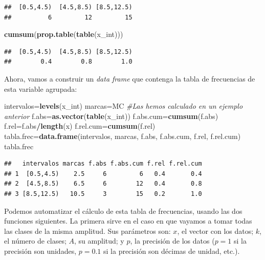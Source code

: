 \documentclass[]{book}
\newenvironment{Shaded}{\begin{snugshade}}{\end{snugshade}}
\newcommand{\CommentTok}[1]{\textcolor[rgb]{0.56,0.35,0.01}{\textit{#1}}}
\newcommand{\KeywordTok}[1]{\textcolor[rgb]{0.13,0.29,0.53}{\textbf{#1}}}
\newcommand{\NormalTok}[1]{#1}
\newcommand{\OperatorTok}[1]{\textcolor[rgb]{0.81,0.36,0.00}{\textbf{#1}}}
\theoremstyle{definition}
\theoremstyle{definition}
\theoremstyle{definition}
\theoremstyle{remark}
\begin{document}
\begin{verbatim}
##  [0.5,4.5)  [4.5,8.5) [8.5,12.5) 
##          6         12         15
\end{verbatim}

\begin{Shaded}
\begin{Highlighting}[]
\KeywordTok{cumsum}\NormalTok{(}\KeywordTok{prop.table}\NormalTok{(}\KeywordTok{table}\NormalTok{(x_int)))}
\end{Highlighting}
\end{Shaded}

\begin{verbatim}
##  [0.5,4.5)  [4.5,8.5) [8.5,12.5) 
##        0.4        0.8        1.0
\end{verbatim}

Ahora, vamos a construir un \emph{data frame} que contenga la tabla de frecuencias de esta variable agrupada:

\begin{Shaded}
\begin{Highlighting}[]
\NormalTok{intervalos=}\KeywordTok{levels}\NormalTok{(x_int)}
\NormalTok{marcas=MC  }\CommentTok{#Las hemos calculado en un ejemplo anterior}
\NormalTok{f.abs=}\KeywordTok{as.vector}\NormalTok{(}\KeywordTok{table}\NormalTok{(x_int))}
\NormalTok{f.abs.cum=}\KeywordTok{cumsum}\NormalTok{(f.abs)}
\NormalTok{f.rel=f.abs}\OperatorTok{/}\KeywordTok{length}\NormalTok{(x)}
\NormalTok{f.rel.cum=}\KeywordTok{cumsum}\NormalTok{(f.rel)}
\NormalTok{tabla.frec=}\KeywordTok{data.frame}\NormalTok{(intervalos, marcas, f.abs, f.abs.cum, f.rel, f.rel.cum)}
\NormalTok{tabla.frec}
\end{Highlighting}
\end{Shaded}

\begin{verbatim}
##   intervalos marcas f.abs f.abs.cum f.rel f.rel.cum
## 1  [0.5,4.5)    2.5     6         6   0.4       0.4
## 2  [4.5,8.5)    6.5     6        12   0.4       0.8
## 3 [8.5,12.5)   10.5     3        15   0.2       1.0
\end{verbatim}

Podemos automatizar el cálculo de esta tabla de frecuencias, usando las dos funciones siguientes.
La primera sirve en el caso en que vayamos a tomar todas las clases de la misma amplitud.
Sus parámetros son: \(x\), el vector con los datos; \(k\), el número de clases; \(A\), su amplitud; y \(p\), la precisión de los datos (\(p=1\) si la precisión son unidades, \(p=0.1\) si la precisión son décimas de unidad, etc.).
\end{document}
